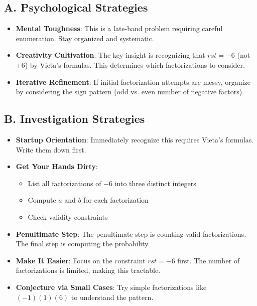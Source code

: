 \documentclass[12pt]{article}
\begin{document}
\begin{strategicbox}
\subsection*{A. Psychological Strategies}
\begin{itemize}[leftmargin=*]
    \item \textbf{Mental Toughness}: This is a late-band problem requiring careful enumeration. Stay organized and systematic.
    
    \item \textbf{Creativity Cultivation}: The key insight is recognizing that $rst = -6$ (not $+6$) by Vieta's formulas. This determines which factorizations to consider.
    
    \item \textbf{Iterative Refinement}: If initial factorization attempts are messy, organize by considering the sign pattern (odd vs. even number of negative factors).
\end{itemize}

\subsection*{B. Investigation Strategies}
\begin{itemize}[leftmargin=*]
    \item \textbf{Startup Orientation}: Immediately recognize this requires Vieta's formulas. Write them down first.
    
    \item \textbf{Get Your Hands Dirty}: 
    \begin{itemize}
        \item List all factorizations of $-6$ into three distinct integers
        \item Compute $a$ and $b$ for each factorization
        \item Check validity constraints
    \end{itemize}
    
    \item \textbf{Penultimate Step}: The penultimate step is counting valid factorizations. The final step is computing the probability.
    
    \item \textbf{Make It Easier}: Focus on the constraint $rst = -6$ first. The number of factorizations is limited, making this tractable.
    
    \item \textbf{Conjecture via Small Cases}: Try simple factorizations like $(-1)(1)(6)$ to understand the pattern.
    

\end{itemize}
\end{strategicbox}
\end{document}
